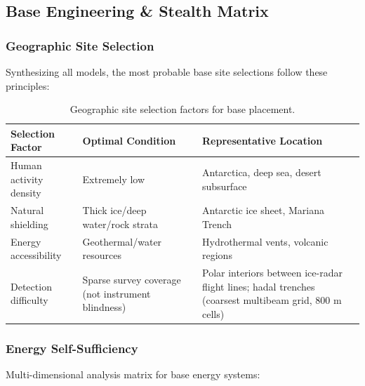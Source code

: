 \documentclass[aps,prd,twocolumn,superscriptaddress,nofootinbib]{revtex4-2}
\begin{document}
\subsection{Base Engineering \& Stealth Matrix}\label{sec:base-engineering}

\subsubsection{Geographic Site Selection}\label{sec:site-selection}

Synthesizing all models, the most probable base site selections follow these principles:

\begin{table}[htbp]
\caption{Geographic site selection factors for base placement.}
\label{tab:site-selection}
\footnotesize
\begin{tabular}{P{0.238\textwidth}P{0.286\textwidth}P{0.373\textwidth}}
\toprule
Selection Factor & Optimal Condition & Representative Location \\
\midrule
Human activity density & Extremely low & Antarctica, deep sea, desert subsurface \\
Natural shielding & Thick ice/deep water/rock strata & Antarctic ice sheet, Mariana Trench \\
Energy accessibility & Geothermal/water resources & Hydrothermal vents, volcanic regions \\
Detection difficulty & Sparse survey coverage (not instrument blindness) & Polar interiors between ice-radar flight lines; hadal trenches (coarsest multibeam grid, 800 m cells) \\
\bottomrule
\end{tabular}
\end{table}

\subsubsection{Energy Self-Sufficiency}\label{sec:energy-self}

Multi-dimensional analysis matrix for base energy systems:
\end{document}
